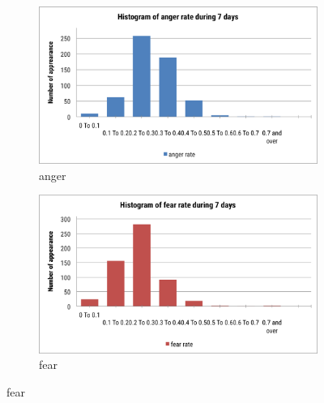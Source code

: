 \begin{figure}[htb!] 
\centering    
\begin{subfigure}{0.5\textwidth}
\centering
\includegraphics[width=0.8\linewidth]{HistogramAngerWeek}
\caption{anger}
\label{fig:histogramAngerWeek}
\end{subfigure}%
\begin{subfigure}{0.5\textwidth}
\centering    
\includegraphics[width=0.8\linewidth]{HistogramFearWeek}
\caption{fear}
\label{fig:histogramFearWeek}


\end{subfigure}
\end{figure}
